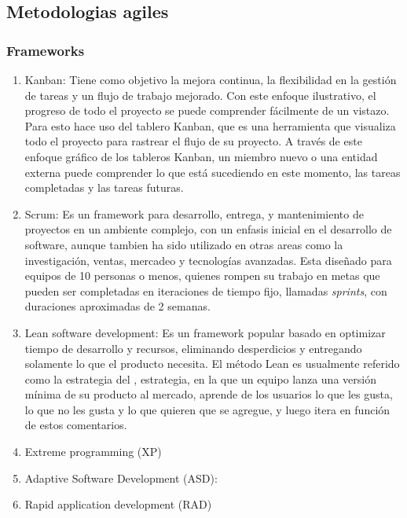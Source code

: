 \subsection{Metodologias agiles}


    \subsubsection{Frameworks}

    \begin{enumerate}
        \item Kanban: Tiene como objetivo la mejora continua, la flexibilidad en la gestión de tareas y un flujo de trabajo mejorado. Con este enfoque ilustrativo, el progreso de todo el proyecto se puede comprender fácilmente de un vistazo. Para esto hace uso del tablero Kanban, que es una herramienta que visualiza todo el proyecto para rastrear el flujo de su proyecto. A través de este enfoque gráfico de los tableros Kanban, un miembro nuevo o una entidad externa puede comprender lo que está sucediendo en este momento, las tareas completadas y las tareas futuras.
        \item Scrum: Es un framework para desarrollo, entrega, y mantenimiento de proyectos en un ambiente complejo, con un enfasis inicial en el desarrollo de software, aunque tambien ha sido utilizado en otras areas como la investigación, ventas, mercadeo y tecnologías avanzadas. Esta diseñado para equipos de 10 personas o menos, quienes rompen su trabajo en metas que pueden ser completadas en iteraciones de tiempo fijo, llamadas \emph{sprints}, con duraciones aproximadas de 2 semanas. 
        \item Lean software development: Es un framework popular basado en optimizar tiempo de desarrollo y recursos, eliminando desperdicios y entregando solamente lo que el producto necesita. El método Lean es usualmente referido como la estrategia del , 
        estrategia, en la que un equipo lanza una versión mínima de su producto al mercado, aprende de los usuarios lo que les gusta, lo que no les gusta y lo que quieren que se agregue, y luego itera en función de estos comentarios.
        \item Extreme programming (XP)
        \item Adaptive Software Development (ASD):
        \item Rapid application development (RAD)
    \end{enumerate}

